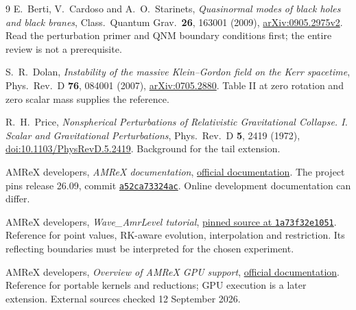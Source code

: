 \documentclass[11pt,a4paper]{article}
\numberwithin{equation}{section}
\begin{document}
\begin{thebibliography}{9}
E.~Berti, V.~Cardoso and A.~O.~Starinets,
\emph{Quasinormal modes of black holes and black branes},
Class.\ Quantum Grav.\ \textbf{26}, 163001 (2009),
\href{https://arxiv.org/abs/0905.2975}{arXiv:0905.2975v2}.
Read the perturbation primer and QNM boundary conditions first; the entire
review is not a prerequisite.

S.~R.~Dolan,
\emph{Instability of the massive Klein--Gordon field on the Kerr spacetime},
Phys.\ Rev.\ D \textbf{76}, 084001 (2007),
\href{https://arxiv.org/abs/0705.2880}{arXiv:0705.2880}.
Table II at zero rotation and zero scalar mass supplies the reference.

R.~H.~Price,
\emph{Nonspherical Perturbations of Relativistic Gravitational Collapse.
I. Scalar and Gravitational Perturbations},
Phys.\ Rev.\ D \textbf{5}, 2419 (1972),
\href{https://doi.org/10.1103/PhysRevD.5.2419}{doi:10.1103/PhysRevD.5.2419}.
Background for the tail extension.

AMReX developers, \emph{AMReX documentation},
\href{https://amrex-codes.github.io/amrex/docs_html/}{official documentation}.
The project pins release 26.09, commit
\href{https://github.com/AMReX-Codes/amrex/tree/a52ca73324ac2c7b65ec04f131e6df99eec9c576}
{\texttt{a52ca73324ac}}. Online development documentation can differ.

AMReX developers, \emph{Wave\_AmrLevel tutorial},
\href{https://github.com/AMReX-Codes/amrex-tutorials/tree/1a73f32e10514d917333ea7a3fd54e661e232144/ExampleCodes/Amr/Wave_AmrLevel}
{pinned source at \texttt{1a73f32e1051}}.
Reference for point values, RK-aware evolution, interpolation and restriction.
Its reflecting boundaries must be interpreted for the chosen experiment.

AMReX developers, \emph{Overview of AMReX GPU support},
\href{https://amrex-codes.github.io/amrex/docs_html/GPU.html}
{official documentation}.
Reference for portable kernels and reductions; GPU execution is a later
extension. External sources checked 12 September 2026.
\end{thebibliography}
\end{document}
